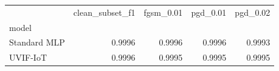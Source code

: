 \begin{tabular}{lrrrr}
\toprule
 & clean_subset_f1 & fgsm_0.01 & pgd_0.01 & pgd_0.02 \\
model &  &  &  &  \\
\midrule
Standard MLP & 0.9996 & 0.9996 & 0.9996 & 0.9993 \\
UVIF-IoT & 0.9996 & 0.9995 & 0.9995 & 0.9995 \\
\bottomrule
\end{tabular}
